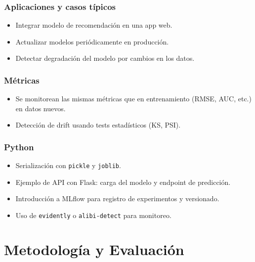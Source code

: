 \documentclass[12pt,a4paper,openany,oneside]{book}
\begin{document}
\subsection{Aplicaciones y casos típicos}
\begin{itemize}
    \item Integrar modelo de recomendación en una app web.
    \item Actualizar modelos periódicamente en producción.
    \item Detectar degradación del modelo por cambios en los datos.
\end{itemize}

\subsection{Métricas}
\begin{itemize}
    \item Se monitorean las mismas métricas que en entrenamiento (RMSE, AUC, etc.) en datos nuevos.
    \item Detección de drift usando tests estadísticos (KS, PSI).
\end{itemize}

\subsection{Python}
\begin{itemize}
    \item Serialización con \texttt{pickle} y \texttt{joblib}.
    \item Ejemplo de API con Flask: carga del modelo y endpoint de predicción.
    \item Introducción a MLflow para registro de experimentos y versionado.
    \item Uso de \texttt{evidently} o \texttt{alibi-detect} para monitoreo.
\end{itemize}

\chapter{Metodología y Evaluación}
\end{document}

